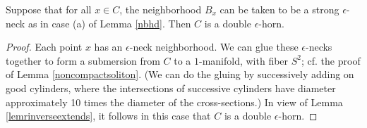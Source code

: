 \begin{lemma}
  \label{lem:kl-structure-at-first-singularity-time-neck-geometry-lemma}
 \label{doublehorn}
Suppose that for all $x \in C$,
the neighborhood $B_x$ can be taken to be a strong
$\epsilon$-neck as in case (a) of Lemma \ref{nbhd}.
Then $C$ is a double $\epsilon$-horn.
\end{lemma}
\begin{proof}
Each point $x$ has an $\epsilon$-neck neighborhood.
We can glue these $\epsilon$-necks together to form a
submersion from $C$ to a $1$-manifold, with fiber $S^2$;
cf. the proof of Lemma \ref{noncompactsoliton}. (We can
do the gluing by successively adding on good
cylinders, where the intersections of successive cylinders
have diameter approximately 10 times the diameter of the cross-sections.)
In view of Lemma
\ref{lemrinverseextends}, it follows in this case that
$C$ is a double $\epsilon$-horn.
\end{proof}


